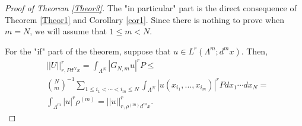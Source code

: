 \documentclass[12pt,leqno]{amsart}
\numberwithin{equation}{section}
\numberwithin{theor}{section}
\numberwithin{rem}{section}
\begin{document}
\begin{proof}[Proof of Theorem \ref{Theor3}]
The "in particular" part is the direct consequence of Theorem \ref{Theor1} and Corollary \ref{cor1}.  Since there is nothing to prove when $m=N$, we will assume that $1\leq m <N$.   

For the "if" part of the theorem, suppose that $u\in L^{r}(\Lambda^m; d^{m}x)$.  Then,
\begin{equation}
\begin{split}
&|| U ||_{r, P d^{N}x}^r=\int_{\Lambda^N} |G_{N,m} u |^r P
\leq \\
&\binom{N}{m}^{-1} \sum_{1\leq i_1<\cdots<i_m\leq N }
\int_{\Lambda^{N}} | u(x_{i_1},...,x_{i_m}) |^r P dx_1\cdots dx_N=\\
&\int_{\Lambda^{m}} | u |^r \rho^{(m)} = 
|| u ||_{r, \rho^{(m)} d^{m}x}^r.
\end{split}
\end{equation}


\end{proof}
\end{document}
